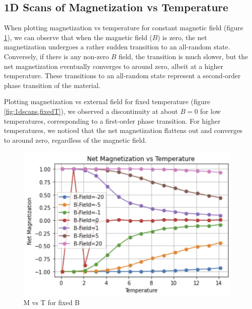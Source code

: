 \documentclass[%
 reprint,
 amsmath,amssymb,
 aps,
]{revtex4-2}
\begin{document}
\subsection{\label{sec:level2}1D Scans of Magnetization vs Temperature}
When plotting magnetization vs temperature for constant magnetic field (figure \ref{fig:1dscans,fixedB}), we can observe that when the magnetic field (\(B\)) is zero, the net magnetization undergoes a rather sudden transition to an all-random state. Conversely, if there is any non-zero \(B\) field, the transition is much slower, but the net magnetization eventually converges to around zero, albeit at a higher temperature. These transitions to an all-random state represent a second-order phase transition of the material.

Plotting magnetization vs external field for fixed temperature (figure \ref{fig:1dscans,fixedT}), we observed a discontinuity at about \(B=0\) for low temperatures, corresponding to a first-order phase transition. For higher temperatures, we noticed that the net magnetization flattens out and converges to around zero, regardless of the magnetic field.

\begin{figure}
    \centering
    \includegraphics[width=1\linewidth]{1dscans,fixedB.png}
    \caption{M vs T for fixed B}
    \label{fig:1dscans,fixedB}
\end{figure}
\end{document}
